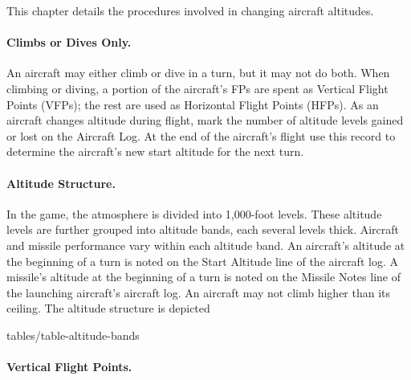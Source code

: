 
\label{rule:changing-aircraft-altitude}


This chapter details the procedures involved in changing aircraft altitudes.

\paragraph{Climbs or Dives Only.} 
An aircraft may either climb or dive in a turn, but it may not do both.  When climbing or diving, a portion of the aircraft's FPs are spent as Vertical Flight Points (VFPs); the rest are used as Horizontal Flight Points (HFPs). As an aircraft changes altitude during flight, mark the number of altitude levels gained or lost on the Aircraft Log. At the end of the aircraft's flight use this record to determine the aircraft's new start altitude for the next turn.

\paragraph{Altitude Structure.} In the game, the atmosphere is divided into 1,000-foot levels. These altitude levels are further grouped into altitude bands, each several levels thick. Aircraft and missile performance vary within each altitude band. An aircraft's altitude at the beginning of a turn is noted on the Start Altitude line of the aircraft log. A missile's altitude at the beginning of a turn is noted on the Missile Notes line of the launching aircraft's aircraft log. An aircraft may not climb higher than its ceiling. The altitude structure is depicted 

 {tables/table-altitude-bands}

\paragraph{Vertical Flight Points.} 

